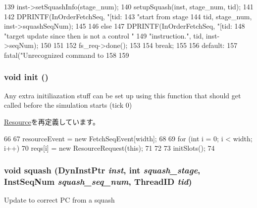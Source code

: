 \begin{DoxyCode}
{{{{{139                     inst->setSquashInfo(stage_num);
140                     setupSquash(inst, stage_num, tid);
141 
142                     DPRINTF(InOrderFetchSeq, "[tid:%
143                             "start from stage %
144                             tid, stage_num, inst->squashSeqNum);
145                 }
146             } else {
147                 DPRINTF(InOrderFetchSeq, "[tid:%
148                         "target update since then is not a control "
149                         "instruction.\n", tid, inst->seqNum);
150             }
151 
152             fs_req->done();
153         }
154         break;
155 
156       default:
157         fatal("Unrecognized command to %
158     }
159 }
\end{DoxyCode}
\hypertarget{classFetchSeqUnit_a02fd73d861ef2e4aabb38c0c9ff82947}{
\subsubsection[{init}]{\setlength{\rightskip}{0pt plus 5cm}void init ()}}
\label{classFetchSeqUnit_a02fd73d861ef2e4aabb38c0c9ff82947}
Any extra initiliazation stuff can be set up using this function that should get called before the simulation starts (tick 0) 

\hyperlink{classResource_a02fd73d861ef2e4aabb38c0c9ff82947}{Resource}を再定義しています。


\begin{DoxyCode}
66 {
67     resourceEvent = new FetchSeqEvent[width];
68 
69     for (int i = 0; i < width; i++) {
70         reqs[i] = new ResourceRequest(this);
71     }
72 
73     initSlots();
74 }
\end{DoxyCode}
\hypertarget{classFetchSeqUnit_a48e371fe43e53aebbe5b2b2afc5aa8e3}{
\subsubsection[{squash}]{\setlength{\rightskip}{0pt plus 5cm}void squash ({\bf DynInstPtr} {\em inst}, \/  int {\em squash\_\-stage}, \/  {\bf InstSeqNum} {\em squash\_\-seq\_\-num}, \/  {\bf ThreadID} {\em tid})}}
\label{classFetchSeqUnit_a48e371fe43e53aebbe5b2b2afc5aa8e3}
Update to correct PC from a squash 

